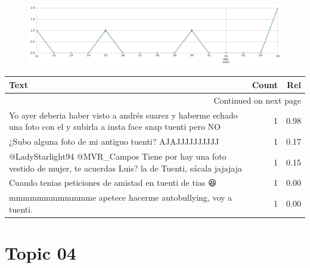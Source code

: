\begin{figure}[htbp!]
    \centering
    \includegraphics[width=\textwidth]{twitter_murcia/report_images/topic-03-timeseries.jpg}
\end{figure}

\begin{longtable}{p{12.5cm}rr}
\toprule
Text & Count & Rel \\
\midrule
\endhead
\midrule
\multicolumn{3}{r}{{Continued on next page}} \\
\midrule
\endfoot

\bottomrule
\endlastfoot
Yo ayer deberia haber visto a andrés suarez y haberme echado una foto con el y subirla a insta face snap tuenti pero NO & 1 & 0.98 \\
¿Subo alguna foto de mi antiguo tuenti? AJAJJJJJJJJJJ & 1 & 0.17 \\
@LadyStarlight94 @MVR\_Campos Tiene por hay una foto vestido de mujer, te acuerdas Luis? la de Tuenti, sácala jajajaja & 1 & 0.15 \\
Cuando tenias peticiones de amistad en tuenti de tias 😆 & 1 & 0.00 \\
mmmmmmmmmmmme apetece hacerme autobullying, voy a tuenti. & 1 & 0.00 \\

\end{longtable}
\clearpage

\section{Topic 04}

